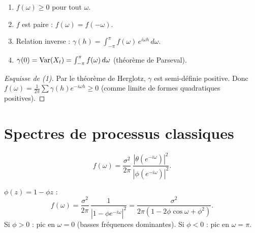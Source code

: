 \begin{theoreme}[Propri\'et\'es de $f$]
\begin{enumerate}
\item $f(\omega)\geq 0$ pour tout $\omega$.
\item $f$ est paire : $f(\omega)=f(-\omega)$.
\item Relation inverse : $\gamma(h) = \int_{-\pi}^{\pi}f(\omega)\,e^{i\omega h}\,d\omega$.
\item $\gamma(0) = \operatorname{Var}(X_t) = \int_{-\pi}^{\pi}f(\omega)\,d\omega$ (th\'eor\`eme de Parseval).
\end{enumerate}
\end{theoreme}

\begin{proof}[Esquisse de (1)]
Par le th\'eor\`eme de Herglotz, $\gamma$ est semi-d\'efinie positive. Donc $f(\omega)=\frac{1}{2\pi}\sum\gamma(h)e^{-i\omega h}\geq 0$ (comme limite de formes quadratiques positives).
\end{proof}

\section{Spectres de processus classiques}

\begin{theoreme}
\[
f(\omega) = \frac{\sigma^2}{2\pi}\,\frac{|\theta(e^{-i\omega})|^2}{|\phi(e^{-i\omega})|^2}.
\]
\end{theoreme}

\begin{exemple}[Spectre d'un AR(1)]
$\phi(z)=1-\phi z$ :
\[
f(\omega) = \frac{\sigma^2}{2\pi}\,\frac{1}{|1-\phi e^{-i\omega}|^2} = \frac{\sigma^2}{2\pi(1-2\phi\cos\omega+\phi^2)}.
\]
Si $\phi>0$ : pic en $\omega=0$ (basses fr\'equences dominantes). Si $\phi<0$ : pic en $\omega=\pi$.
\end{exemple}

\begin{center}
\end{center}

